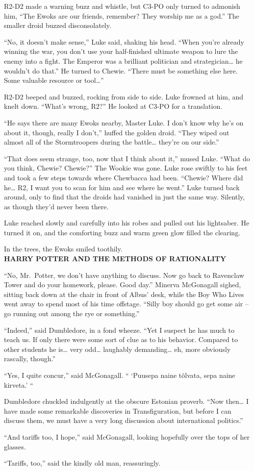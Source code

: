 R2-D2 made a warning buzz and whistle, but C3-PO only turned to admonish
him, ``The Ewoks are our friends, remember? They worship me as a god.''
The smaller droid buzzed disconsolately.

``No, it doesn't make sense,'' Luke said, shaking his head. ``When
you're already winning the war, you don't use your half-finished
ultimate weapon to lure the enemy into a fight. The Emperor was a
brilliant politician and strategician\ldots{} he wouldn't do that.'' He
turned to Chewie. ``There must be something else here. Some valuable
resource or tool\ldots{}''

R2-D2 beeped and buzzed, rocking from side to side. Luke frowned at him,
and knelt down. ``What's wrong, R2?'' He looked at C3-PO for a
translation.

``He says there are many Ewoks nearby, Master Luke. I don't know why
he's on about it, though, really I don't,'' huffed the golden droid.
``They wiped out almost all of the Stormtroopers during the
battle\ldots{} they're on our side.''

``That does seem strange, too, now that I think about it,'' mused Luke.
``What do you think, Chewie? Chewie?'' The Wookie was gone. Luke rose
swiftly to his feet and took a few steps towards where Chewbacca had
been. ``Chewie? Where did he\ldots{} R2, I want you to scan for him and
see where he went.'' Luke turned back around, only to find that the
droids had vanished in just the same way. Silently, as though they'd
never been there.

Luke reached slowly and carefully into his robes and pulled out his
lightsaber. He turned it on, and the comforting buzz and warm green glow
filled the clearing.

In the trees, the Ewoks smiled toothily.\\

\textbf{HARRY POTTER AND THE METHODS OF RATIONALITY}

``No, Mr.~Potter, we don't have anything to discuss. Now go back to
Ravenclaw Tower and do your homework, please. Good day.'' Minerva
McGonagall sighed, sitting back down at the chair in front of Albus'
desk, while the Boy Who Lives went away to spend most of his time
offstage. ``Silly boy should go get some air -- go running out among the
rye or something.''

``Indeed,'' said Dumbledore, in a fond wheeze. ``Yet I suspect he has
much to teach us. If only there were some sort of clue as to his
behavior. Compared to other students he is\ldots{} very odd\ldots{}
laughably demanding\ldots{} eh, more obviously rascally, though.''

``Yes, I quite concur,'' said McGonagall. `` `Puusepa naine tõlvata,
sepa naine kirveta.' ``

Dumbledore chuckled indulgently at the obscure Estonian proverb. ``Now
then\ldots{} I have made some remarkable discoveries in Transfiguration,
but before I can discuss them, we must have a very long discussion about
international politics.''

``And tariffs too, I hope,'' said McGonagall, looking hopefully over the
tops of her glasses.

``Tariffs, too,'' said the kindly old man, reassuringly. \Stopbonus
